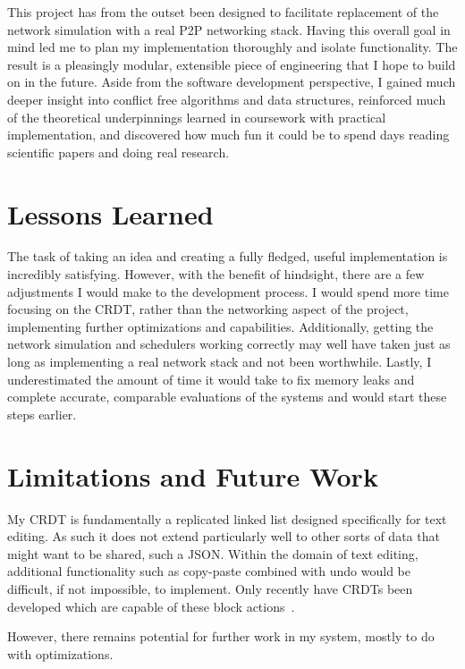 \documentclass[12pt,a4paper,twoside,openright]{report}
\begin{document}
This project has from the outset been designed to facilitate replacement of the network simulation with a real P2P networking stack. Having this overall goal in mind led me to plan my implementation thoroughly and isolate functionality. The result is a pleasingly modular, extensible piece of engineering that I hope to build on in the future. Aside from the software development perspective, I gained much deeper insight into conflict free algorithms and data structures, reinforced much of the theoretical underpinnings learned in coursework with practical implementation, and discovered how much fun it could be to spend days reading scientific papers and doing real research.

\section{Lessons Learned}
The task of taking an idea and creating a fully fledged, useful implementation is incredibly satisfying. However, with the benefit of hindsight, there are a few adjustments I would make to the development process. I would spend more time focusing on the CRDT, rather than the networking aspect of the project, implementing further optimizations and capabilities. Additionally, getting the network simulation and schedulers working correctly may well have taken just as long as implementing a real network stack and not been worthwhile. Lastly, I underestimated the amount of time it would take to fix memory leaks and complete accurate, comparable evaluations of the systems and would start these steps earlier.


\section{Limitations and Future Work} \label{sec:futurework}

My CRDT is fundamentally a replicated linked list designed specifically for text editing. As such it does not extend particularly well to other sorts of data that might want to be shared, such a JSON. Within the domain of text editing, additional functionality such as copy-paste combined with undo would be difficult, if not impossible, to implement. Only recently have CRDTs been developed which are capable of these block actions~\cite{yu2015crdt}.

However, there remains potential for further work in my system, mostly to do with optimizations.
\end{document}
